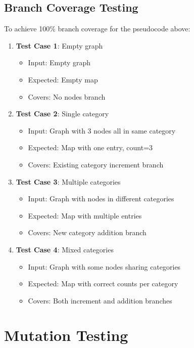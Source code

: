 \documentclass{scrreprt}
\begin{document}
\section{Branch Coverage Testing}
To achieve 100\% branch coverage for the pseudocode above:

\begin{enumerate}
    \item \textbf{Test Case 1}: Empty graph
    \begin{itemize}
        \item Input: Empty graph
        \item Expected: Empty map
        \item Covers: No nodes branch
    \end{itemize}
    
    \item \textbf{Test Case 2}: Single category
    \begin{itemize}
        \item Input: Graph with 3 nodes all in same category
        \item Expected: Map with one entry, count=3
        \item Covers: Existing category increment branch
    \end{itemize}
    
    \item \textbf{Test Case 3}: Multiple categories
    \begin{itemize}
        \item Input: Graph with nodes in different categories
        \item Expected: Map with multiple entries
        \item Covers: New category addition branch
    \end{itemize}
    
    \item \textbf{Test Case 4}: Mixed categories
    \begin{itemize}
        \item Input: Graph with some nodes sharing categories
        \item Expected: Map with correct counts per category
        \item Covers: Both increment and addition branches
    \end{itemize}
\end{enumerate}

\chapter{Mutation Testing}
\end{document}

